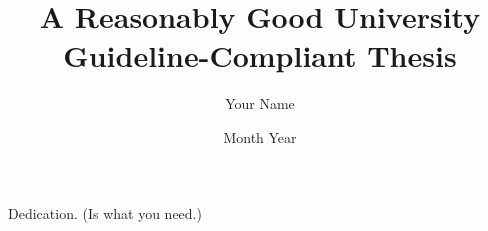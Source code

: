 \documentclass[oneside,nogutter,hidelinks]{glasgowthesis}
\begin{document}
\pagestyle{empty}

\title{A Reasonably Good University Guideline-Compliant Thesis}
\author{Your Name}
\date{Month Year}

\maketitle

\cleardoublepage



\newpage


\newpage


\cleardoublepage
\vspace*{1.75in}
\begin{flushright} Dedication. (Is what you need.)\end{flushright}








\tableofcontents
\listoffigures
\listoftables

\cleardoublepage
\pagestyle{fancy}
\setcounter{page}{1}
\end{document}
